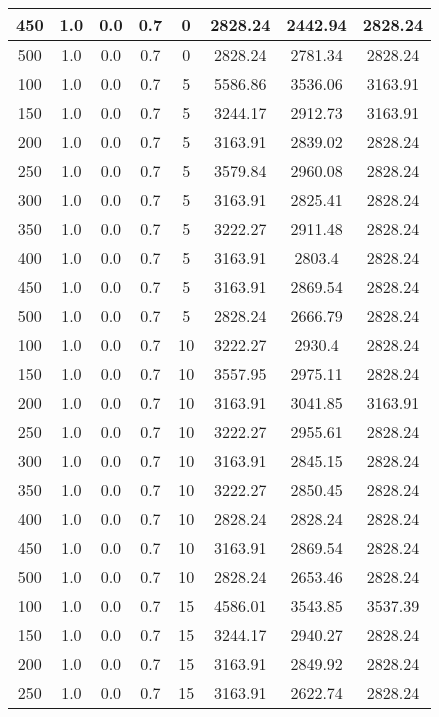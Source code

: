 \documentclass[a4paper, 12pt]{extreport}
\begin{document}
\begin{itemize}
\begin{longtable}{|c|c|c|c|c|c|c|c|}
			450 & 1.0 & 0.0 & 0.7 & 0 & 2828.24 & 2442.94 & 2828.24 \\\hline
			500 & 1.0 & 0.0 & 0.7 & 0 & 2828.24 & 2781.34 & 2828.24 \\\hline
			100 & 1.0 & 0.0 & 0.7 & 5 & 5586.86 & 3536.06 & 3163.91 \\\hline
			150 & 1.0 & 0.0 & 0.7 & 5 & 3244.17 & 2912.73 & 3163.91 \\\hline
			200 & 1.0 & 0.0 & 0.7 & 5 & 3163.91 & 2839.02 & 2828.24 \\\hline
			250 & 1.0 & 0.0 & 0.7 & 5 & 3579.84 & 2960.08 & 2828.24 \\\hline
			300 & 1.0 & 0.0 & 0.7 & 5 & 3163.91 & 2825.41 & 2828.24 \\\hline
			350 & 1.0 & 0.0 & 0.7 & 5 & 3222.27 & 2911.48 & 2828.24 \\\hline
			400 & 1.0 & 0.0 & 0.7 & 5 & 3163.91 & 2803.4 & 2828.24 \\\hline
			450 & 1.0 & 0.0 & 0.7 & 5 & 3163.91 & 2869.54 & 2828.24 \\\hline
			500 & 1.0 & 0.0 & 0.7 & 5 & 2828.24 & 2666.79 & 2828.24 \\\hline
			100 & 1.0 & 0.0 & 0.7 & 10 & 3222.27 & 2930.4 & 2828.24 \\\hline
			150 & 1.0 & 0.0 & 0.7 & 10 & 3557.95 & 2975.11 & 2828.24 \\\hline
			200 & 1.0 & 0.0 & 0.7 & 10 & 3163.91 & 3041.85 & 3163.91 \\\hline
			250 & 1.0 & 0.0 & 0.7 & 10 & 3222.27 & 2955.61 & 2828.24 \\\hline
			300 & 1.0 & 0.0 & 0.7 & 10 & 3163.91 & 2845.15 & 2828.24 \\\hline
			350 & 1.0 & 0.0 & 0.7 & 10 & 3222.27 & 2850.45 & 2828.24 \\\hline
			400 & 1.0 & 0.0 & 0.7 & 10 & 2828.24 & 2828.24 & 2828.24 \\\hline
			450 & 1.0 & 0.0 & 0.7 & 10 & 3163.91 & 2869.54 & 2828.24 \\\hline
			500 & 1.0 & 0.0 & 0.7 & 10 & 2828.24 & 2653.46 & 2828.24 \\\hline
			100 & 1.0 & 0.0 & 0.7 & 15 & 4586.01 & 3543.85 & 3537.39 \\\hline
			150 & 1.0 & 0.0 & 0.7 & 15 & 3244.17 & 2940.27 & 2828.24 \\\hline
			200 & 1.0 & 0.0 & 0.7 & 15 & 3163.91 & 2849.92 & 2828.24 \\\hline
			250 & 1.0 & 0.0 & 0.7 & 15 & 3163.91 & 2622.74 & 2828.24 \\\hline

\end{longtable}
\end{itemize}
\end{document}
